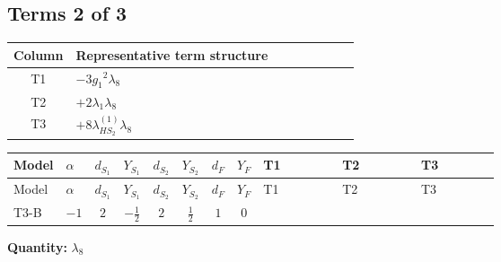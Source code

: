\documentclass[8pt]{article}
\begin{document}
\begin{landscape}
\subsection*{Terms 2 of 3}
\begin{center}
\begin{tabular}{@{}c >{\raggedright\arraybackslash}p{0.82\linewidth}@{}}
\toprule
Column & Representative term structure \\
\midrule
T1 & \(\displaystyle -3 {g_1}^2 {\lambda_{8}}\) \\
\midrule
T2 & \(\displaystyle +2 {\lambda_1} {\lambda_{8}}\) \\
\midrule
T3 & \(\displaystyle +8 {\lambda_{HS_2}^{(1)}} {\lambda_{8}}\) \\
\midrule
\bottomrule
\end{tabular}
\end{center}
\smallskip
\tiny
\begin{longtable}{@{}llcccccc >{\raggedright\arraybackslash}p{0.21\linewidth} >{\raggedright\arraybackslash}p{0.21\linewidth} >{\raggedright\arraybackslash}p{0.21\linewidth}@{}}
\toprule
Model & $\alpha$ & $d_{S_1}$ & $Y_{S_1}$ & $d_{S_2}$ & $Y_{S_2}$ & $d_F$ & $Y_F$ & T1 & T2 & T3 \\
\midrule
\endfirsthead
\toprule
Model & $\alpha$ & $d_{S_1}$ & $Y_{S_1}$ & $d_{S_2}$ & $Y_{S_2}$ & $d_F$ & $Y_F$ & T1 & T2 & T3 \\
\midrule
\endhead
T3-B & $-1$ & $2$ & $-\frac{1}{2}$ & $2$ & $\frac{1}{2}$ & $1$ & $0$ & \scriptsize\adjustbox{max width=\linewidth}{$\begin{gathered} -3 {g_1}^2 {\lambda_{8}}\end{gathered}$} & \scriptsize\adjustbox{max width=\linewidth}{$\begin{gathered} +2 {\lambda_1} {\lambda_{8}}\end{gathered}$} & \scriptsize\adjustbox{max width=\linewidth}{$\begin{gathered} +8 {\lambda_{HS_2}^{(1)}} {\lambda_{8}}\end{gathered}$} \\
\midrule
\bottomrule
\end{longtable}
\clearpage
\noindent\textbf{Quantity: }$\lambda_{8}$\par\smallskip

\end{landscape}
\end{document}
